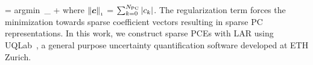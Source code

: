 \be
{} = \mbox{argmin}~_{\bm\theta}
\left[\left(\sum_{k=0}^\Npc c_k \Psi_k(\bm\xi(\bm\theta)) -
\GG^{\mbox{\tiny{M}}}(\bm{\theta})\right)^{2}\right]  + \lambda{}
\ee
where $\left\| {\bm{c}} \right\|_{\scriptscriptstyle 1}$ = $\sum_{k=0}^{N_\text{PC}} |c_k |$.
The regularization term forces the minimization towards sparse coefficient vectors resulting
in sparse PC representations.
In this work, we construct sparse PCEs with LAR using UQLab~\cite{Marelli:2014},
a general purpose uncertainty quantification software developed at ETH Zurich.


















